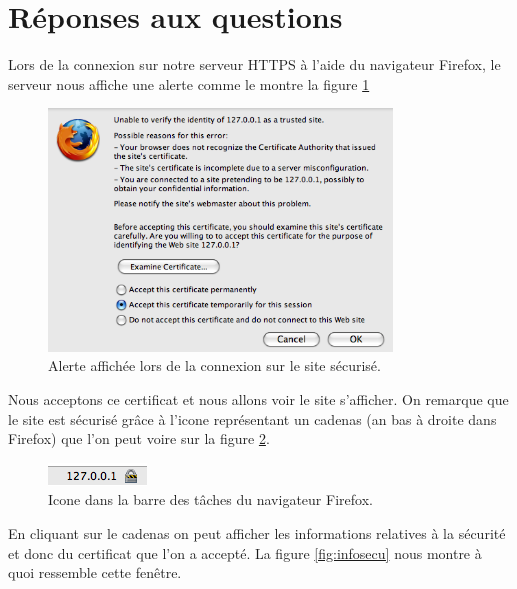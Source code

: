 \documentclass[10pt,a4paper,titlepage]{article}
\begin{document}
\section{Réponses aux questions}

Lors de la connexion sur notre serveur HTTPS à l'aide du navigateur Firefox, le serveur nous affiche une alerte comme le montre la figure \ref{fig:connex}

\begin{figure}[htbp]
   \begin{center}
      \includegraphics[width=345px]{img/1.png}
   \end{center}
   \caption{Alerte affichée lors de la connexion sur le site sécurisé.}
	\label{fig:connex}
\end{figure}

Nous acceptons ce certificat et nous allons voir le site s'afficher. On remarque que le site est sécurisé grâce à l'icone représentant un cadenas (an bas à droite dans Firefox) que l'on peut voire sur la figure \ref{fig:icone}.

\begin{figure}[htbp]
   \begin{center}
      \includegraphics[height=23px]{img/2.png}
   \end{center}
   \caption{Icone dans la barre des tâches du navigateur Firefox.}
	\label{fig:icone}
\end{figure}

En cliquant sur le cadenas on peut afficher les informations relatives à la sécurité et donc du certificat que l'on a accepté. La figure \ref{fig:infosecu} nous montre à quoi ressemble cette fenêtre.
\end{document}
